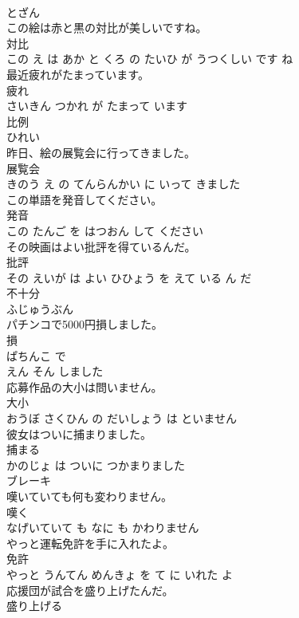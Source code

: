 \documentclass[8pt]{extreport}
\begin{document}
\begin{CJK}{UTF8}{min}
\\	とざん		
\\	この絵は赤と黒の対比が美しいですね。	
\\	対比 
\\	この え は あか と くろ の たいひ が うつくしい です ね			
\\	最近疲れがたまっています。	
\\	疲れ 
\\	さいきん つかれ が たまって います			
\\	比例	
\\	ひれい		
\\	昨日、絵の展覧会に行ってきました。	
\\	展覧会 
\\	きのう え の てんらんかい に いって きました			
\\	この単語を発音してください。	
\\	発音 
\\	この たんご を はつおん して ください			
\\	その映画はよい批評を得ているんだ。	
\\	批評 
\\	その えいが は よい ひひょう を えて いる ん だ			
\\	不十分	
\\	ふじゅうぶん		
\\	パチンコで5000円損しました。	
\\	損 
\\	ぱちんこ で 
\\	えん そん しました			
\\	応募作品の大小は問いません。	
\\	大小 
\\	おうぼ さくひん の だいしょう は といません			
\\	彼女はついに捕まりました。	
\\	捕まる 
\\	かのじょ は ついに つかまりました			
\\	ブレーキ	
\\	嘆いていても何も変わりません。	
\\	嘆く 
\\	なげいていて も なに も かわりません			
\\	やっと運転免許を手に入れたよ。	
\\	免許 
\\	やっと うんてん めんきょ を て に いれた よ			
\\	応援団が試合を盛り上げたんだ。	
\\	盛り上げる 

\end{CJK}
\end{document}
